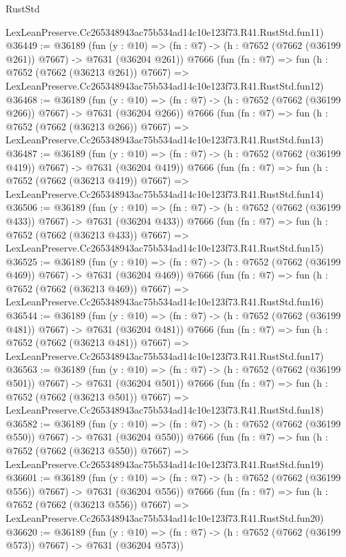 \begin{lexlean}{RustStd}
\begin{coremodule}
    LexLeanPreserve.Cc265348943ac75b534ad14c10e123f73.R41.RustStd.fun11)
@36449 := @36189
    (fun (y : @10) => (fn : @7) -> (h : @7652 (@7662 (@36199 @261)) @7667) -> @7631 (@36204 @261))
    @7666
    (fun (fn : @7) =>
    fun (h : @7652 (@7662 (@36213 @261)) @7667) =>
    LexLeanPreserve.Cc265348943ac75b534ad14c10e123f73.R41.RustStd.fun12)
@36468 := @36189
    (fun (y : @10) => (fn : @7) -> (h : @7652 (@7662 (@36199 @266)) @7667) -> @7631 (@36204 @266))
    @7666
    (fun (fn : @7) =>
    fun (h : @7652 (@7662 (@36213 @266)) @7667) =>
    LexLeanPreserve.Cc265348943ac75b534ad14c10e123f73.R41.RustStd.fun13)
@36487 := @36189
    (fun (y : @10) => (fn : @7) -> (h : @7652 (@7662 (@36199 @419)) @7667) -> @7631 (@36204 @419))
    @7666
    (fun (fn : @7) =>
    fun (h : @7652 (@7662 (@36213 @419)) @7667) =>
    LexLeanPreserve.Cc265348943ac75b534ad14c10e123f73.R41.RustStd.fun14)
@36506 := @36189
    (fun (y : @10) => (fn : @7) -> (h : @7652 (@7662 (@36199 @433)) @7667) -> @7631 (@36204 @433))
    @7666
    (fun (fn : @7) =>
    fun (h : @7652 (@7662 (@36213 @433)) @7667) =>
    LexLeanPreserve.Cc265348943ac75b534ad14c10e123f73.R41.RustStd.fun15)
@36525 := @36189
    (fun (y : @10) => (fn : @7) -> (h : @7652 (@7662 (@36199 @469)) @7667) -> @7631 (@36204 @469))
    @7666
    (fun (fn : @7) =>
    fun (h : @7652 (@7662 (@36213 @469)) @7667) =>
    LexLeanPreserve.Cc265348943ac75b534ad14c10e123f73.R41.RustStd.fun16)
@36544 := @36189
    (fun (y : @10) => (fn : @7) -> (h : @7652 (@7662 (@36199 @481)) @7667) -> @7631 (@36204 @481))
    @7666
    (fun (fn : @7) =>
    fun (h : @7652 (@7662 (@36213 @481)) @7667) =>
    LexLeanPreserve.Cc265348943ac75b534ad14c10e123f73.R41.RustStd.fun17)
@36563 := @36189
    (fun (y : @10) => (fn : @7) -> (h : @7652 (@7662 (@36199 @501)) @7667) -> @7631 (@36204 @501))
    @7666
    (fun (fn : @7) =>
    fun (h : @7652 (@7662 (@36213 @501)) @7667) =>
    LexLeanPreserve.Cc265348943ac75b534ad14c10e123f73.R41.RustStd.fun18)
@36582 := @36189
    (fun (y : @10) => (fn : @7) -> (h : @7652 (@7662 (@36199 @550)) @7667) -> @7631 (@36204 @550))
    @7666
    (fun (fn : @7) =>
    fun (h : @7652 (@7662 (@36213 @550)) @7667) =>
    LexLeanPreserve.Cc265348943ac75b534ad14c10e123f73.R41.RustStd.fun19)
@36601 := @36189
    (fun (y : @10) => (fn : @7) -> (h : @7652 (@7662 (@36199 @556)) @7667) -> @7631 (@36204 @556))
    @7666
    (fun (fn : @7) =>
    fun (h : @7652 (@7662 (@36213 @556)) @7667) =>
    LexLeanPreserve.Cc265348943ac75b534ad14c10e123f73.R41.RustStd.fun20)
@36620 := @36189
    (fun (y : @10) => (fn : @7) -> (h : @7652 (@7662 (@36199 @573)) @7667) -> @7631 (@36204 @573))

\end{coremodule}
\end{lexlean}
